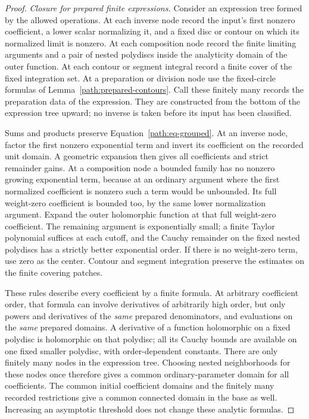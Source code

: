 \begin{proof}
\emph{Closure for prepared finite expressions.}
Consider an expression tree formed by the allowed operations.  At
each inverse node record the input's first nonzero coefficient, a lower
scalar normalizing it, and a fixed disc or contour on which its
normalized limit is nonzero.  At each composition node record the
finite limiting arguments and a pair of nested polydiscs inside the
analyticity domain of the outer function.  At each contour or segment
integral record a finite cover of the fixed integration set.  At a
preparation or division node use the fixed-circle formulas of
Lemma~\ref{path:prepared-contours}.  Call these finitely many records
the preparation data of the expression.  They are constructed from
the bottom of the expression tree upward; no inverse is taken before
its input has been classified.

Sums and products preserve Equation~\eqref{path:eq-grouped}.  At an
inverse node, factor the first nonzero exponential term and invert
its coefficient on the recorded unit domain.  A geometric expansion
then gives all coefficients and strict remainder gains.  At a
composition node a bounded family has no nonzero growing exponential
term, because at an ordinary argument where the first normalized
coefficient is nonzero such a term would be unbounded.  Its full
weight-zero coefficient is bounded too, by the same lower normalization
argument.  Expand the outer holomorphic function at that full
weight-zero coefficient.  The remaining argument is exponentially
small; a finite Taylor polynomial suffices at each cutoff, and the
Cauchy remainder on the fixed nested polydiscs has a strictly better
exponential order.  If there is no weight-zero term, use zero as
the center.  Contour and segment integration preserve the estimates
on the finite covering patches.

These rules describe every coefficient by a finite formula.  At
arbitrary coefficient order, that formula can involve derivatives of
arbitrarily high order, but only powers and derivatives of the
\emph{same} prepared denominators, and evaluations on the \emph{same}
prepared domains.  A derivative of a function holomorphic on a fixed
polydisc is holomorphic on that polydisc; all its Cauchy bounds are
available on one fixed smaller polydisc, with order-dependent constants.
There are only finitely many nodes in the expression tree.  Choosing
nested neighborhoods for these nodes once therefore gives a common
ordinary-parameter domain for all coefficients.  The common initial
coefficient domains and the finitely many recorded restrictions give
a common connected domain in the base as well.  Increasing an
asymptotic threshold does not change these analytic formulas.


\end{proof}
